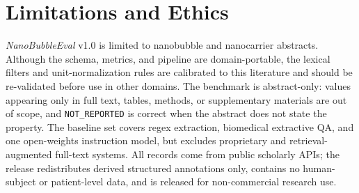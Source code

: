 \documentclass{article}
\newcommand{\NR}{\texttt{NOT\_REPORTED}}
\begin{document}


\section{Limitations and Ethics}
\label{sec:limitations}

\textit{NanoBubbleEval} v1.0 is limited to nanobubble and nanocarrier abstracts. Although the schema, metrics, and pipeline are domain-portable, the lexical filters and unit-normalization rules are calibrated to this literature and should be re-validated before use in other domains. The benchmark is abstract-only: values appearing only in full text, tables, methods, or supplementary materials are out of scope, and \NR{} is correct when the abstract does not state the property. The baseline set covers regex extraction, biomedical extractive QA, and one open-weights instruction model, but excludes proprietary and retrieval-augmented full-text systems. All records come from public scholarly APIs; the release redistributes derived structured annotations only, contains no human-subject or patient-level data, and is released for non-commercial research use.
\end{document}

